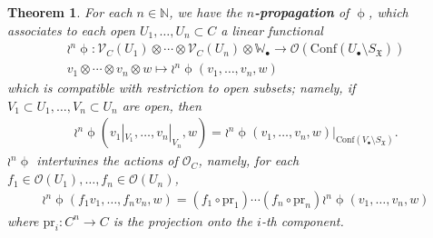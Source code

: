 \documentclass[11pt,b5paper,notitlepage]{article}
\theoremstyle{definition}
\theoremstyle{plain}
\newtheorem{thm}[df]{Theorem}
\newcommand{\fk}{\mathfrak}
\newcommand{\Conf}{\mathrm{Conf}}
\newcommand{\scr}{\mathscr}
\newcommand{\SX}{{S_{\fk X}}}
\newcommand{\blt}{\bullet}
\newcommand{\Wbb}{\mathbb W}
\newcommand{\Nbb}{\mathbb N}
\newcommand{\pr}{\mathrm {pr}}
\numberwithin{equation}{subsection}
\begin{document}
\begin{thm}\label{lb7}
For each $n\in\Nbb$, we have the \textbf{$n$-propagation} of $\upphi$, which associates to each open $U_1,\dots,U_n\subset C$ a linear functional 
\begin{gather*}
\wr^n\upphi:\scr V_C(U_1)\otimes\cdots\otimes\scr V_C(U_n)\otimes\Wbb_\blt\rightarrow\scr O(\Conf(U_\blt\setminus\SX))\\
v_1\otimes\cdots\otimes v_n\otimes w\mapsto \wr^n\upphi(v_1,\dots,v_n,w)
\end{gather*}
which is compatible with restriction to open subsets; namely, if $V_1\subset U_1,\dots,V_n\subset U_n$ are open, then
\begin{align*}
\wr^n\upphi(v_1|_{V_1},\dots,v_n|_{V_n},w)=\wr^n\upphi(v_1,\dots,v_n,w)\big|_{\Conf(V_\blt\setminus\SX)}.	
\end{align*}
$\wr^n\upphi$ intertwines the actions of $\scr O_C$, namely, for each $f_1\in\scr O(U_1),\dots,f_n\in\scr O(U_n)$,
\begin{align*}
\wr^n\upphi(f_1v_1,\dots,f_nv_n,w)=(f_1\circ\pr_1)\cdots (f_n\circ\pr_n)\wr^n\upphi(v_1,\dots,v_n,w)	
\end{align*}
where $\pr_i:C^n\rightarrow C$ is the projection onto the $i$-th component. 



\end{thm}
\end{document}
